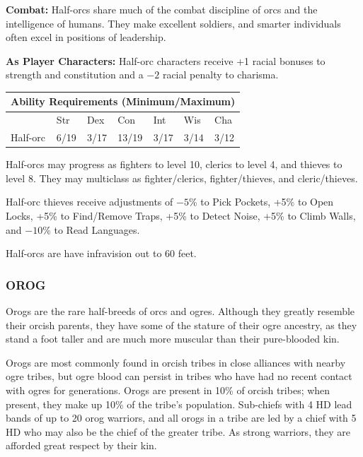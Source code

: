 \begin{multicols}{2}
\textbf{Combat:} Half-orcs share much of the combat discipline of orcs and the intelligence of humans. They make excellent soldiers, and smarter individuals often excel in positions of leadership.

\textbf{As Player Characters:} Half-orc characters receive +1 racial bonuses to strength and constitution and a $-2$ racial penalty to charisma.

\noindent \begin{minipage}{\columnwidth}

\noindent \begin{tabular}{|p{}|p{}|p{}|p{}|p{}|p{}|p{}|}
\multicolumn{7}{c}{Ability Requirements (Minimum/Maximum)} \\
\hline
	& Str	& Dex	& Con	& Int	& Wis	& Cha	\\
\hline\hline
\rowcolor[gray]{.9}Half-orc	& 6/19	& 3/17	& 13/19	& 3/17	& 3/14	& 3/12	\\
\hline
\end{tabular}

\end{minipage}

Half-orcs may progress as fighters to level 10, clerics to level 4, and thieves to level 8. They may multiclass as fighter/clerics, fighter/thieves, and cleric/thieves.

Half-orc thieves receive adjustments of $-5$\% to Pick Pockets, +5\% to Open Locks, +5\% to Find/Remove Traps, +5\% to Detect Noise, +5\% to Climb Walls, and $-10$\% to Read Languages.

Half-orcs are have infravision out to 60 feet.

\subsubsection{OROG}

Orogs are the rare half-breeds of orcs and ogres. Although they greatly resemble their orcish parents, they have some of the stature of their ogre ancestry, as they stand a foot taller and are much more muscular than their pure-blooded kin.

Orogs are most commonly found in orcish tribes in close alliances with nearby ogre tribes, but ogre blood can persist in tribes who have had no recent contact with ogres for generations. Orogs are present in 10\% of orcish tribes; when present, they make up 10\% of the tribe's population. Sub-chiefs with 4 HD lead bands of up to 20 orog warriors, and all orogs in a tribe are led by a chief with 5 HD who may also be the chief of the greater tribe. As strong warriors, they are afforded great respect by their kin. 


\end{multicols}
